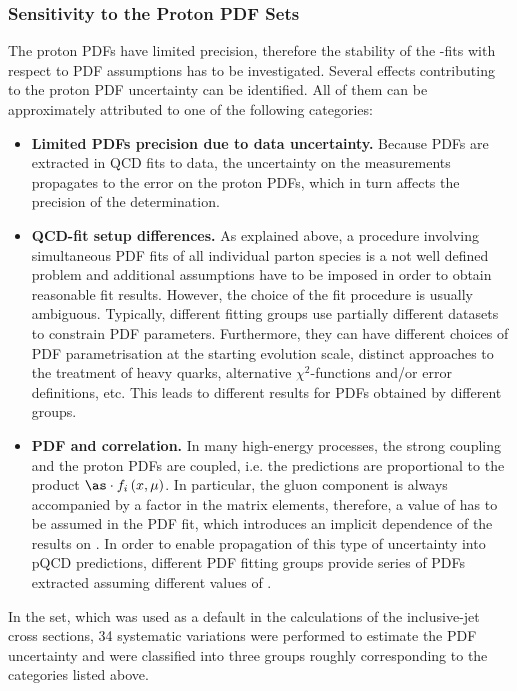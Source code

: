 \subsubsection{Sensitivity to the Proton PDF Sets}
\label{subsec:aspdfassump}
The proton PDFs have limited precision, therefore the stability of the \asz-fits with respect to PDF assumptions has to be investigated. Several effects contributing to the proton PDF uncertainty can be identified. All of them can be approximately attributed to one of the following categories:
\begin{itemize}
 \item \textbf{Limited PDFs precision due to data uncertainty.} Because PDFs are extracted in QCD fits to data, the uncertainty on the measurements propagates to the error on the proton PDFs, which in turn affects the precision of the \asz determination.
 \item \textbf{QCD-fit setup differences.} As explained above, a procedure involving simultaneous PDF fits of all individual parton species is a not well defined problem and additional assumptions have to be imposed in order to obtain reasonable fit results. However, the choice of the fit procedure is usually ambiguous. Typically, different fitting groups use partially different datasets to constrain PDF parameters. Furthermore, they can have different choices of PDF parametrisation at the starting evolution scale, distinct approaches to the treatment of heavy quarks, alternative $\chi^2$-functions and/or error definitions, etc. This leads to different results for PDFs obtained by different groups.
 \item \textbf{PDF and \asz correlation.} In many high-energy processes, the strong coupling and the proton PDFs are coupled, i.e. the predictions are proportional to the product $\as\cdot f_i\left(x,\mu\right)$. In particular, the gluon component is always accompanied by a factor \as in the matrix elements, therefore, a value of \asz has to be assumed in the PDF fit, which introduces an implicit dependence of the results on \asz. In order to enable propagation of this type of uncertainty into pQCD predictions, different PDF fitting groups provide series of PDFs extracted assuming different values of \asz.
\end{itemize}

In the  set, which was used as a default in the calculations of the inclusive-jet cross sections, 34 systematic variations were performed to estimate the PDF uncertainty and were classified into three groups roughly corresponding to the categories listed above. 

